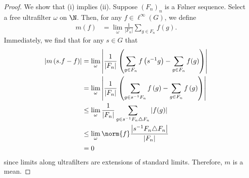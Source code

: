 \documentclass[10pt]{mypackage}
\begin{document}
\begin{proof}
  We show that (i) implies (ii). Suppose $\left( F_n \right)_{n}$ is a Følner sequence. Select a free ultrafilter $\omega$ on $\N$. Then, for any $f\in \ell^{\infty}\left( G \right)$, we define
  \begin{align*}
    m\left( f \right) &= \lim_{\omega}\frac{1}{\left\vert F_n \right\vert}\sum_{g\in F_n}f(g).
  \end{align*}
  Immediately, we find that for any $s\in G$ that
  \begin{align*}
    \left\vert m\left( s.f-f \right) \right\vert &= \lim_{\omega} \left\vert \frac{1}{\left\vert F_n \right\vert}\left( \sum_{g\in F_n}f\left( s^{-1}g \right) - \sum_{g\in F_n}f(g) \right) \right\vert\\
                                                 &= \lim_{\omega}\left\vert \frac{1}{\left\vert F_n \right\vert}\left( \sum_{g\in s^{-1}F_n}f\left( g \right) - \sum_{g\in F_n}f\left( g \right) \right) \right\vert\\
                                                 &\leq \lim_{\omega}\frac{1}{\left\vert F_n \right\vert}\sum_{g\in s^{-1}F_n\triangle F_n}\left\vert f(g) \right\vert\\
                                                 &\leq \lim_{\omega}\norm{f} \frac{\left\vert s^{-1}F_n\triangle F_n \right\vert}{\left\vert F_n \right\vert}\\
                                                 &= 0
  \end{align*}
  since limits along ultrafilters are extensions of standard limits. Therefore, $m$ is a mean.


\end{proof}
\end{document}
